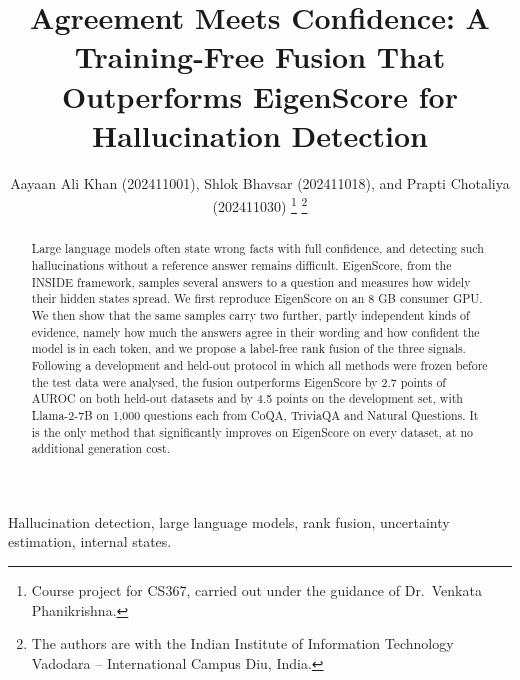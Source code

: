 \documentclass[journal]{IEEEtran}
\begin{document}
\title{Agreement Meets Confidence: A Training-Free Fusion That Outperforms EigenScore for Hallucination Detection}

\author{Aayaan Ali Khan (202411001), Shlok Bhavsar (202411018), and Prapti Chotaliya (202411030)
\thanks{Course project for CS367, carried out under the guidance of Dr.~Venkata Phanikrishna.}
\thanks{The authors are with the Indian Institute of Information Technology Vadodara -- International Campus Diu, India.}}


\maketitle

\begin{abstract}
Large language models often state wrong facts with full confidence, and detecting such hallucinations without a reference answer remains difficult. EigenScore, from the INSIDE framework, samples several answers to a question and measures how widely their hidden states spread. We first reproduce EigenScore on an 8 GB consumer GPU. We then show that the same samples carry two further, partly independent kinds of evidence, namely how much the answers agree in their wording and how confident the model is in each token, and we propose a label-free rank fusion of the three signals. Following a development and held-out protocol in which all methods were frozen before the test data were analysed, the fusion outperforms EigenScore by 2.7 points of AUROC on both held-out datasets and by 4.5 points on the development set, with Llama-2-7B on 1,000 questions each from CoQA, TriviaQA and Natural Questions. It is the only method that significantly improves on EigenScore on every dataset, at no additional generation cost.
\end{abstract}

\begin{IEEEkeywords}
Hallucination detection, large language models, rank fusion, uncertainty estimation, internal states.
\end{IEEEkeywords}

\IEEEpeerreviewmaketitle

\end{document}
